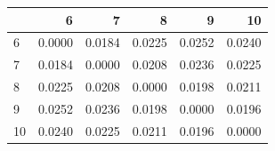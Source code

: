\begin{tabular}{lrrrrr}
\toprule
 & 6 & 7 & 8 & 9 & 10 \\
\midrule
6 & 0.0000 & 0.0184 & 0.0225 & 0.0252 & 0.0240 \\
7 & 0.0184 & 0.0000 & 0.0208 & 0.0236 & 0.0225 \\
8 & 0.0225 & 0.0208 & 0.0000 & 0.0198 & 0.0211 \\
9 & 0.0252 & 0.0236 & 0.0198 & 0.0000 & 0.0196 \\
10 & 0.0240 & 0.0225 & 0.0211 & 0.0196 & 0.0000 \\
\bottomrule
\end{tabular}
